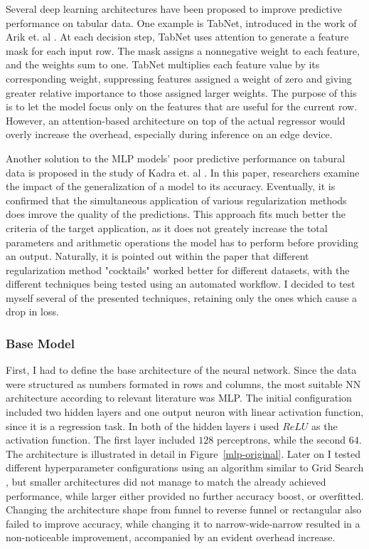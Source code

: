 Several deep learning architectures have been proposed to improve predictive performance on tabular data. One example is TabNet, introduced in the work of Arik et. al \cite{tabnet}. At each decision step, TabNet uses attention to generate a feature mask for each input row. The mask assigns a nonnegative weight to each feature, and the weights sum to one. TabNet multiplies each feature value by its corresponding weight, suppressing features assigned a weight of zero and giving greater relative importance to those assigned larger weights. The purpose of this is to let the model focus only on the features that are useful for the current row. However, an attention-based architecture on top of the actual regressor would overly increase the overhead, especially during inference on an edge device.

Another solution to the MLP models' poor predictive performance on tabural data is proposed in the study of Kadra et. al \cite{tabdata-nn}. In this paper, researchers examine the impact of the generalization of a model to its accuracy. Eventually, it is confirmed that the simultaneous application of various regularization methods does imrove the quality of the predictions. This approach fits much better the criteria of the target application, as it does not greately increase the total parameters and arithmetic operations the model has to perform before providing an output. Naturally, it is pointed out within the paper that different regularization method "cocktails" worked better for different datasets, with the different techniques being tested using an automated workflow. I decided to test myself several of the presented techniques, retaining only the ones which cause a drop in loss.

\subsubsection{Base Model}

First, I had to define the base architecture of the neural network. Since the data were structured as numbers formated in rows and columns, the most suitable NN architecture according to relevant literature was MLP. The initial configuration included two hidden layers and one output neuron with linear activation function, since it is a regression task. In both of the hidden layers i used $ReLU$ as the activation function. The first layer included $128$ perceptrons, while the second $64$. The architecture is illustrated in detail in Figure~\ref{mlp-original}. Later on I tested different hyperparameter configurations using an algorithm similar to Grid Search \cite{NAS}, but smaller architectures did not manage to match the already achieved performance, while larger either provided no further accuracy boost, or overfitted. Changing the architecture shape from funnel to reverse funnel or rectangular also failed to improve accuracy, while changing it to narrow-wide-narrow resulted in a non-noticeable improvement, accompanied by an evident overhead increase.

